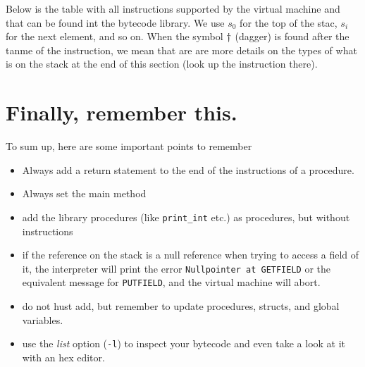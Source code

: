 \documentclass[11pt]{article}
\begin{document}
Below is the table with all instructions supported by the virtual machine
and that can be found int the bytecode library. We use \(s_0\) for the top of
the stac, \(s_i\) for the next element, and so on. When the symbol
\(\dagger\) (dagger) is found after the tanme of the instruction, we
mean that are are more details on the types of what is on the stack at the
end of this section (look up the instruction there).
\section{Finally, remember this.}
\label{sec:org4ef853f}
\label{orge4c0527}

To sum up, here are some important points to remember

\begin{itemize}
\item Always add a return statement to the end of the instructions of a
procedure.
\item Always set the main method
\item add the library procedures (like \texttt{print\_int} etc.) as procedures, but
without instructions
\item if the reference on the stack is a null reference when trying to access a
field of it, the interpreter will print the error \texttt{Nullpointer at
  GETFIELD} or the equivalent message for \texttt{PUTFIELD}, and the virtual
machine will abort.
\item do not hust add, but remember to update procedures, structs, and global
variables.
\item use the \emph{list} option (\texttt{-l}) to inspect your bytecode and even take a
look at it with an hex editor.
\end{itemize}
\end{document}
